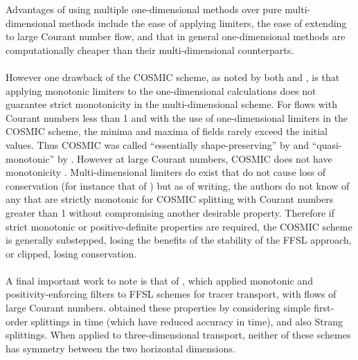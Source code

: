 \documentclass[11pt,a4paper]{article}
\begin{document}
Advantages of using multiple one-dimensional methods over pure multi-dimensional methods include the ease of applying limiters, the ease of extending to large Courant number flow, and that in general one-dimensional methods are computationally cheaper than their multi-dimensional counterparts. \\
\\
However one drawback of the COSMIC scheme, as noted by both \citet{leonard1996cosmic} and \citet{lin1996ffsl},  is that applying monotonic limiters to the one-dimensional calculations does not guarantee strict monotonicity in the multi-dimensional scheme.
For flows with Courant numbers less than 1 and with the use of one-dimensional limiters in the COSMIC scheme, the minima and maxima of fields rarely exceed the initial values.
Thus COSMIC was called ``essentially shape-preserving'' by \citet{leonard1996cosmic} and ``quasi-monotonic'' by \citet{putman2007fvtransport}.
However at large Courant numbers, COSMIC does not have monotonicity \citep{leonard1996cosmic,bott2010improving}.
Multi-dimensional limiters do exist that do not cause loss of conservation (for instance that of \citet{thuburn1996multidimensional}) but as of writing, the authors do not know of any that are strictly monotonic for COSMIC splitting with Courant numbers greater than 1 without compromising another desirable property.
Therefore if strict monotonic or positive-definite properties are required, the COSMIC scheme is generally substepped, losing the benefits of the stability of the FFSL approach, or clipped, losing conservation. \\
\\
A final important work to note is that of \citet{skamarock2006limiters}, which applied monotonic and positivity-enforcing filters to FFSL schemes for tracer transport, with flows of large Courant numbers.
\citet{skamarock2006limiters} obtained these properties by considering simple first-order splittings in time (which have reduced accuracy in time), and also Strang splittings.
When applied to three-dimensional transport, neither of these schemes has symmetry between the two horizontal dimensions.
 
\end{document}
